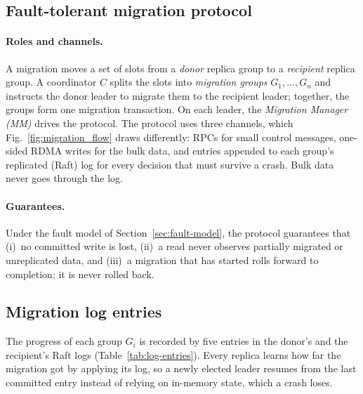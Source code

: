 \providecommand{\openq}[1]{{\color{red}[OPEN: #1]}}

\subsection{Fault-tolerant migration protocol}
\label{sec:migration-protocol}

\paragraph{Roles and channels.}
A migration moves a set of slots from a \emph{donor} replica group to a \emph{recipient} replica group.
A coordinator $C$ splits the slots into \emph{migration groups} $G_1, \dots, G_n$ and instructs the donor leader to migrate them to the recipient leader; together, the groups form one migration transaction.
On each leader, the \emph{Migration Manager (MM)} drives the protocol.
The protocol uses three channels, which Fig.~\ref{fig:migration_flow} draws differently:
RPCs for small control messages,
one-sided RDMA writes for the bulk data,
and entries appended to each group's replicated (Raft) log for every decision that must survive a crash.
Bulk data never goes through the log.

\paragraph{Guarantees.}
Under the fault model of Section~\ref{sec:fault-model}, the protocol guarantees that
(i)~no committed write is lost,
(ii)~a read never observes partially migrated or unreplicated data, and
(iii)~a migration that has started rolls forward to completion; it is never rolled back.

\subsection{Migration log entries}
\label{sec:log-entries}

The progress of each group $G_i$ is recorded by five entries in the donor's and the recipient's Raft logs (Table~\ref{tab:log-entries}).
Every replica learns how far the migration got by applying its log, so a newly elected leader resumes from the last committed entry instead of relying on in-memory state, which a crash loses.

